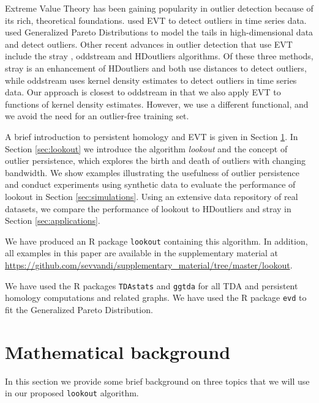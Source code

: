 \documentclass[12pt]{article}
\theoremstyle{definition}
\theoremstyle{definition}
\theoremstyle{definition}
\theoremstyle{remark}
\begin{document}
Extreme Value Theory has been gaining popularity in outlier detection because of its rich, theoretical foundations. \citet{Burridge2006} used EVT to detect outliers in time series data. \citet{Clifton2014} used Generalized Pareto Distributions to model the tails in high-dimensional data and detect outliers. Other recent advances in outlier detection that use EVT include the stray \citep{stray}, oddstream \citep{talagala2019anomaly} and HDoutliers \citep{wilkinson2017visualizing} algorithms. Of these three methods, stray is an enhancement of HDoutliers and both use distances to detect outliers, while oddstream uses kernel density estimates to detect outliers in time series data. Our approach is closest to oddstream in that we also apply EVT to functions of kernel density estimates. However, we use a different functional, and we avoid the need for an outlier-free training set.

A brief introduction to persistent homology and EVT is given in Section \ref{sec:methodology}. In Section \ref{sec:lookout} we introduce the algorithm \emph{lookout} and the concept of outlier persistence, which explores the birth and death of outliers with changing bandwidth. We show examples illustrating the usefulness of outlier persistence and conduct experiments using synthetic data to evaluate the performance of lookout in Section \ref{sec:simulations}. Using an extensive data repository of real datasets, we compare the performance of lookout to HDoutliers and stray in Section \ref{sec:applications}.

We have produced an R package \texttt{lookout} \citep{lookoutR} containing this algorithm. In addition, all examples in this paper are available in the supplementary material at \url{https://github.com/sevvandi/supplementary_material/tree/master/lookout}.

We have used the R packages \texttt{TDAstats} \citep{tdastatsR} and \texttt{ggtda} \citep{ggdta} for all TDA and persistent homology computations and related graphs. We have used the R package \texttt{evd} \citep{evdR} to fit the Generalized Pareto Distribution.

\hypertarget{sec:methodology}{%
\section{Mathematical background}\label{sec:methodology}}

In this section we provide some brief background on three topics that we will use in our proposed \texttt{lookout} algorithm.
\end{document}
